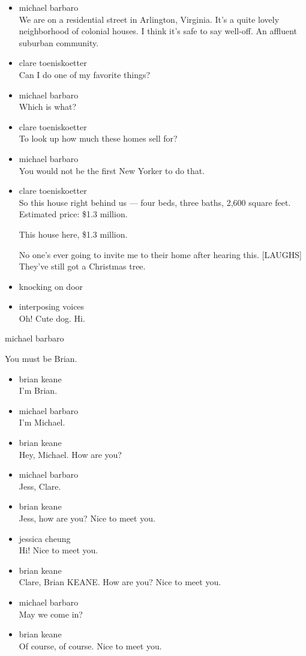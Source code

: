 \begin{itemize}
\item
  michael barbaro\\
  We are on a residential street in Arlington, Virginia. It's a quite
  lovely neighborhood of colonial houses. I think it's safe to say
  well-off. An affluent suburban community.
\item
  clare toeniskoetter\\
  Can I do one of my favorite things?
\item
  michael barbaro\\
  Which is what?
\item
  clare toeniskoetter\\
  To look up how much these homes sell for?
\item
  michael barbaro\\
  You would not be the first New Yorker to do that.
\item
  clare toeniskoetter\\
  So this house right behind us --- four beds, three baths, 2,600 square
  feet. Estimated price: \$1.3 million.

  This house here, \$1.3 million.

  No one's ever going to invite me to their home after hearing this.
  {[}LAUGHS{]} They've still got a Christmas tree.
\item
  knocking on door
\item
  interposing voices\\
  Oh! Cute dog. Hi.
\end{itemize}

michael barbaro

You must be Brian.

\begin{itemize}
\item
  brian keane\\
  I'm Brian.
\item
  michael barbaro\\
  I'm Michael.
\item
  brian keane\\
  Hey, Michael. How are you?
\item
  michael barbaro\\
  Jess, Clare.
\item
  brian keane\\
  Jess, how are you? Nice to meet you.
\item
  jessica cheung\\
  Hi! Nice to meet you.
\item
  brian keane\\
  Clare, Brian KEANE. How are you? Nice to meet you.
\item
  michael barbaro\\
  May we come in?
\item
  brian keane\\
  Of course, of course. Nice to meet you.
\end{itemize}


